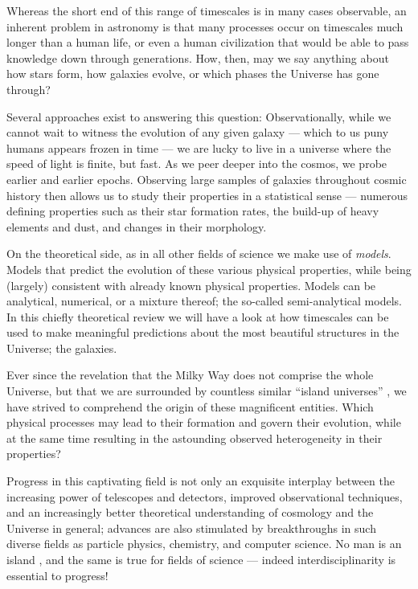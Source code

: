 \documentclass[useAMS,usenatbib,bibyear]{aa}
\begin{document}
Whereas the short end of this range of timescales is in many cases observable, an inherent problem in astronomy is that many processes occur on timescales much longer than a human life, or even a human civilization that would be able to pass knowledge down through generations.
How, then, may we say anything about how stars form, how galaxies evolve, or which phases the Universe has gone through?

Several approaches exist to answering this question: Observationally, while we cannot wait to witness the evolution of any given galaxy --- which to us puny humans appears frozen in time --- we are lucky to live in a universe where the speed of light is finite, but fast.
As we peer deeper into the cosmos, we probe earlier and earlier epochs.
Observing large samples of galaxies throughout cosmic history then allows us to study their properties in a statistical sense --- numerous defining properties such as their star formation rates, the build-up of heavy elements and dust, and changes in their morphology.

On the theoretical side, as in all other fields of science we make use of \emph{models}.
Models that predict the evolution of these various physical properties, while being (largely) consistent with already known physical properties.
Models can be analytical, numerical, or a mixture thereof; the so-called semi-analytical models.
In this chiefly theoretical review we will have a look at how timescales can be used to make meaningful predictions about the most beautiful structures in the Universe; the galaxies.

Ever since the revelation that the Milky Way does not comprise the whole Universe, but that we are surrounded by countless similar ``island universes'' \citep{Shapley1921,Hubble1926}, we have strived to comprehend the origin of these magnificent entities.
Which physical processes may lead to their formation and govern their evolution, while at the same time resulting in the astounding observed heterogeneity in their properties?

Progress in this captivating field is not only an exquisite interplay between
the increasing power of telescopes and detectors,
improved observational techniques,
and an increasingly better theoretical understanding of cosmology and the Universe in general;
advances are also stimulated by breakthroughs in such diverse fields as particle physics, chemistry, and computer science.
No man is an island \citep{Jovi1990}, and the same is true for fields of science --- indeed interdisciplinarity is essential to progress!
\end{document}
